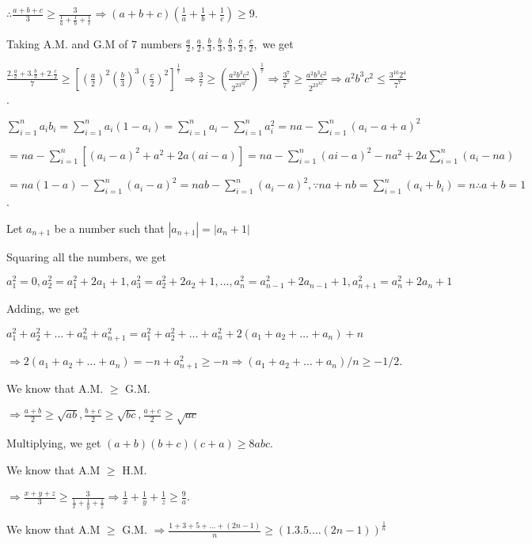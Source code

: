   $\therefore \frac{a + b + c}{3}\geq \frac{3}{\frac{1}{a} + \frac{1}{b} + \frac{1}{c}} \Rightarrow (a + b + c)\left(\frac{1}{a} +
  \frac{1}{b} + \frac{1}{c}\right)\geq 9$.
\item Taking A.M. and G.M of $7$ numbers $\frac{a}{2}, \frac{a}{2}, \frac{b}{3}, \frac{b}{3}, \frac{b}{3},
  \frac{c}{2}, \frac{c}{2},$ we get

  $\frac{2.\frac{a}{2} + 3.\frac{b}{3} + 2.\frac{c}{2}}{7}\geq
  \left[\left(\frac{a}{2}\right)^2\left(\frac{b}{3}\right)^3\left(\frac{c}{2}\right)^2\right]^{\frac{1}{7}}\Rightarrow
  \frac{3}{7}\geq \left(\frac{a^2b^3c^2}{2^23^32^2}\right)^{\frac{1}{7}}\Rightarrow \frac{3^7}{7^7}\geq
  \frac{a^2b^3c^2}{2^23^32^2}\Rightarrow a^2b^3c^2 \leq \frac{3^{10}2^4}{7^7}$.
\item $\displaystyle\sum_{i=1}^na_ib_i = \sum_{i=1}^na_i(1 - a_i) = \sum_{i=1}^na_i - \sum_{i=1}^na_i^2 = na -
  \sum_{i=1}^n(a_i - a + a)^2$

  $\displaystyle= na - \sum_{i=1}^n[(a_i - a)^2 + a^2 + 2a(ai - a)] = na - \sum_{i=1}^n(ai - a)^2 - na^2 +
  2a\sum_{i=1}^n(a_i - na)$

  $\displaystyle= na(1 - a) - \sum_{i=1}^n(a_i - a)^2 = nab - \sum_{i=1}^n(a_i - a)^2, \because na + nb =
  \sum_{i=1}^n(a_i + b_i) = n \therefore a + b = 1$.
\item Let $a_{n+1}$ be a number such that $|a_{n+1}| = |a_n + 1|$

  Squaring all the numbers, we get

  $a_1^2 = 0, a_2^2 = a_1^2 + 2a_1 + 1, a_3^2 = a_2^2 + 2a_2 + 1,\ldots, a_n^2 = a_{n-1}^2 + 2a_{n-1} + 1,
  a_{n+1}^2 = a_n^2 + 2a_n + 1$

  Adding, we get

  $a_1^2 + a_2^2 + \ldots + a_n^2 + a_{n+1}^2 = a_1^2 + a_2^2 + \ldots + a_n^2 + 2(a_1 + a_2 + \ldots + a_n)
  + n$

  $\Rightarrow 2(a_1 + a_2 + \ldots + a_n) = -n + a_{n+1}^2 \geq -n \Rightarrow (a_1 + a_2 + \ldots +
  a_n)/n\geq -1/2$.
\item We know that A.M. $\geq$ G.M.

  $\Rightarrow \frac{a + b}{2}\geq \sqrt{ab}, \frac{b + c}{2}\geq \sqrt{bc}, \frac{a + c}{2}\geq \sqrt{ac}$

  Multiplying, we get $(a + b)(b + c)(c + a) \geq 8abc$.
\item We know that A.M $\geq$ H.M.

  $\Rightarrow \frac{x + y + z}{3}\geq \frac{3}{\frac{1}{x} + \frac{1}{y} + \frac{1}{z}} \Rightarrow
  \frac{1}{x} + \frac{1}{y} + \frac{1}{z}\geq \frac{9}{a}$.
\item We know that A.M $\geq$ G.M.
  $\Rightarrow \frac{1 + 3 + 5 + \ldots + (2n - 1)}{n}\geq (1.3.5.\ldots(2n - 1))^{\frac{1}{n}}$

